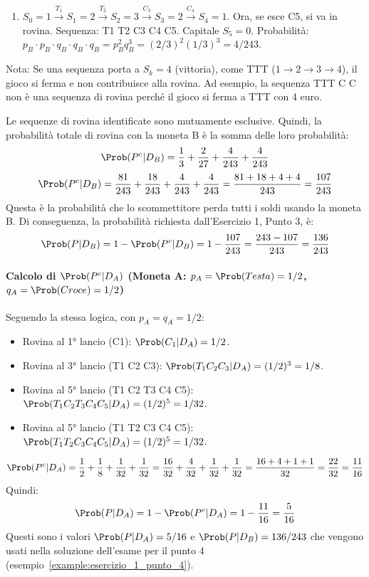 \begin{example}
\begin{itemize}
\begin{enumerate}
        \item $S_0=1 \xrightarrow{T_1} S_1=2 \xrightarrow{T_2} S_2=3 \xrightarrow{C_3} S_3=2 \xrightarrow{C_4} S_4=1$. Ora, se esce C5, si va in rovina.
        Sequenza: T1 T2 C3 C4 C5. Capitale $S_5=0$.
        Probabilità: $p_B \cdot p_B \cdot q_B \cdot q_B \cdot q_B = p_B^2 q_B^3 = (2/3)^2 (1/3)^3 = 4/243$.
    \end{enumerate}
    Nota: Se una sequenza porta a $S_k=4$ (vittoria), come TTT ($1 \to 2 \to 3 \to 4$), il gioco si ferma e non contribuisce alla rovina. Ad esempio, la sequenza TTT C C non è una sequenza di rovina perché il gioco si ferma a TTT con 4 euro.
\end{itemize}
Le sequenze di rovina identificate sono mutuamente esclusive. Quindi, la probabilità totale di rovina con la moneta B è la somma delle loro probabilità:
\[ \Prob(P^c|D_B) = \frac{1}{3} + \frac{2}{27} + \frac{4}{243} + \frac{4}{243} \]
\[ \Prob(P^c|D_B) = \frac{81}{243} + \frac{18}{243} + \frac{4}{243} + \frac{4}{243} = \frac{81+18+4+4}{243} = \frac{107}{243} \]
Questa è la probabilità che lo scommettitore perda tutti i soldi usando la moneta B.
Di conseguenza, la probabilità richiesta dall'Esercizio 1, Punto 3, è:
\[ \Prob(P|D_B) = 1 - \Prob(P^c|D_B) = 1 - \frac{107}{243} = \frac{243 - 107}{243} = \frac{136}{243} \]

\paragraph{Calcolo di $\Prob(P^c|D_A)$ (Moneta A: $p_A = \Prob(Testa) = 1/2$, $q_A = \Prob(Croce) = 1/2$)}
Seguendo la stessa logica, con $p_A=q_A=1/2$:
\begin{itemize}
    \item Rovina al 1° lancio (C1): $\Prob(C_1|D_A) = 1/2$.
    \item Rovina al 3° lancio (T1 C2 C3): $\Prob(T_1 C_2 C_3|D_A) = (1/2)^3 = 1/8$.
    \item Rovina al 5° lancio (T1 C2 T3 C4 C5): $\Prob(T_1 C_2 T_3 C_4 C_5|D_A) = (1/2)^5 = 1/32$.
    \item Rovina al 5° lancio (T1 T2 C3 C4 C5): $\Prob(T_1 T_2 C_3 C_4 C_5|D_A) = (1/2)^5 = 1/32$.
\end{itemize}
\[ \Prob(P^c|D_A) = \frac{1}{2} + \frac{1}{8} + \frac{1}{32} + \frac{1}{32} = \frac{16}{32} + \frac{4}{32} + \frac{1}{32} + \frac{1}{32} = \frac{16+4+1+1}{32} = \frac{22}{32} = \frac{11}{16} \]
Quindi:
\[ \Prob(P|D_A) = 1 - \Prob(P^c|D_A) = 1 - \frac{11}{16} = \frac{5}{16} \]
Questi sono i valori $\Prob(P|D_A)=5/16$ e $\Prob(P|D_B)=136/243$ che vengono usati nella soluzione dell'esame per il punto 4 (esempio~\ref{example:esercizio_1_punto_4}).
\end{example}

